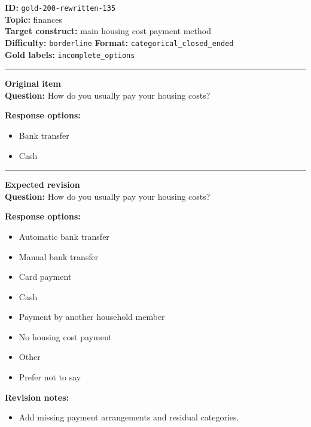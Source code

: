 \documentclass[10pt,a4paper]{article}
\newcommand{\sectionline}{\vspace{0.15em}\hrule\vspace{0.35em}}
\begin{document}
\begin{tcolorbox}[colframe=FlawRed,colback=white,colbacktitle=FlawRed!9,coltitle=black,title={Item 135\hfill Flawed item}]
\textbf{ID:} \texttt{gold-200-rewritten-135}\\
\textbf{Topic:} finances\\
\textbf{Target construct:} main housing cost payment method\\
\textbf{Difficulty:} \texttt{borderline} \quad \textbf{Format:} \texttt{categorical\_closed\_ended}\\
\textbf{Gold labels:} \texttt{incomplete\_options}\\
\sectionline
\textbf{Original item}\\
\textbf{Question:} How do you usually pay your housing costs?
\par\textbf{Response options:}
\begin{itemize}
\item Bank transfer
\item Cash
\end{itemize}
\sectionline
\textbf{Expected revision}\\
\textbf{Question:} How do you usually pay your housing costs?
\par\textbf{Response options:}
\begin{itemize}
\item Automatic bank transfer
\item Manual bank transfer
\item Card payment
\item Cash
\item Payment by another household member
\item No housing cost payment
\item Other
\item Prefer not to say
\end{itemize}
\par\textbf{Revision notes:}
\begin{itemize}
\item Add missing payment arrangements and residual categories.
\end{itemize}
\end{tcolorbox}
\end{document}

